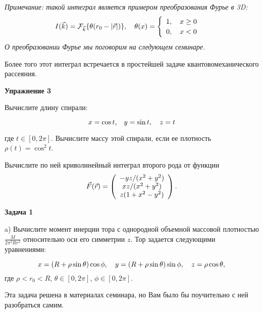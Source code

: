 \documentclass[a4paper,12pt]{article}
\begin{document}
\noindent \textit{Примечание: такой интеграл является примером преобразования Фурье в 3D:}
\begin{equation}\notag
I(\vec{k})	=\mathcal{F}_{\vec{k}}\{\theta(r_{0}-|\vec{r}|)\},\quad\theta(x)=\begin{cases}
\begin{array}{c}
1,\quad x\geq0\\
0,\quad x<0
\end{array}\end{cases}
\end{equation}
\noindent \textit{О преобразовании Фурье мы поговорим на следующем семинаре.}

\noindent Более того этот интеграл встречается в простейшей задаче квантовомеханического рассеяния.

\vspace{15pt}
\noindent \textbf{Упражнение 3}

\noindent Вычислите длину спирали:

\begin{equation}
x=\cos t\text{,}\quad y=\sin t,\quad z=t
\notag
\end{equation}	

\noindent где $t\in[0,2\pi]$. Вычислите массу этой спирали, если ее плотность $\rho(t)=\cos^{2}t$.

\noindent Вычислите по ней криволинейный интеграл второго рода от функции
\begin{equation} \notag
\vec{F}(\vec{r})	=\left(\begin{array}{c}
-yz/(x^{2}+y^{2})\\
xz/(x^{2}+y^{2})\\
z(1+x^{2}-y^{2})
\end{array}\right).
\end{equation}

\vspace{15pt}
\noindent \textbf{Задача 1}

\noindent a) Вычислите момент инерции тора с однородной объемной массовой плотностью $\frac{M}{2\pi^2 Rr^2}$ относительно оси его симметрии $z$. Тор задается следующими уравнениями:

\begin{equation}\notag
x	=(R+\rho\sin\theta)\cos\phi,\quad y=(R+\rho\sin\theta)\sin\phi,\quad z=\rho\cos\theta,
\end{equation}
\noindent где $\rho<r_{0}<R$, $\theta\in[0,2\pi]$, $\phi\in[0,2\pi]$.

\noindent Эта задача решена в материалах семинара, но Вам было бы поучительно с ней разобраться самим.
\end{document}
